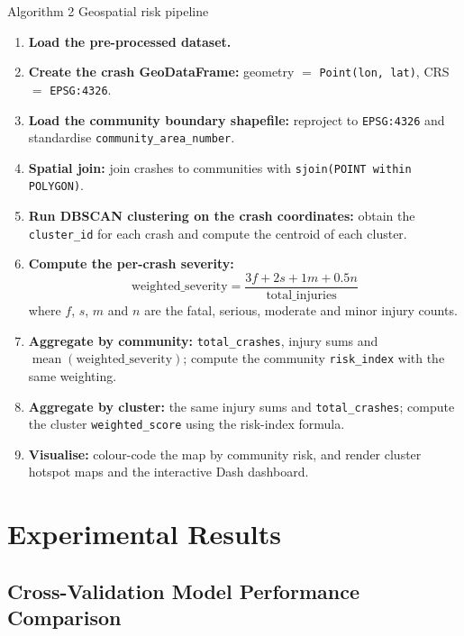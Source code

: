 \documentclass[11pt,a4paper]{article}
\newcommand{\feat}[1]{\texttt{#1}}
\begin{document}
\begin{algobox}{Algorithm 2 \quad Geospatial risk pipeline}
\begin{enumerate}[label=\arabic*.]
  \item \textbf{Load the pre-processed dataset.}
  \item \textbf{Create the crash GeoDataFrame:} geometry $=$ \texttt{Point(lon, lat)},
        CRS $=$ \texttt{EPSG:4326}.
  \item \textbf{Load the community boundary shapefile:} reproject to \texttt{EPSG:4326} and
        standardise \feat{community\_area\_number}.
  \item \textbf{Spatial join:} join crashes to communities with \texttt{sjoin(POINT within POLYGON)}.
  \item \textbf{Run DBSCAN clustering on the crash coordinates:} obtain the \feat{cluster\_id} for
        each crash and compute the centroid of each cluster.
  \item \textbf{Compute the per-crash severity:}
    \[
      \text{weighted\_severity} =
      \frac{3 f + 2 s + 1 m + 0.5 n}{\text{total\_injuries}}
    \]
    where $f$, $s$, $m$ and $n$ are the fatal, serious, moderate and minor injury counts.
  \item \textbf{Aggregate by community:} \feat{total\_crashes}, injury sums and
        $\operatorname{mean}(\text{weighted\_severity})$; compute the community
        \feat{risk\_index} with the same weighting.
  \item \textbf{Aggregate by cluster:} the same injury sums and \feat{total\_crashes}; compute the
        cluster \feat{weighted\_score} using the risk-index formula.
  \item \textbf{Visualise:} colour-code the map by community risk, and render cluster hotspot maps
        and the interactive Dash dashboard.
\end{enumerate}
\end{algobox}

\newpage
\section{Experimental Results}

\subsection{Cross-Validation Model Performance Comparison}
\end{document}
